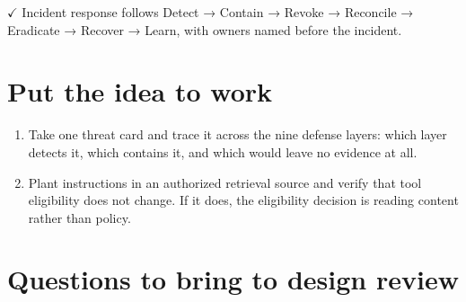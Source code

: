 \textbf{\ensuremath{\checkmark}} Incident response follows Detect → Contain → Revoke → Reconcile → Eradicate → Recover → Learn, with owners named before the incident.\par

\section{Put the idea to work}

\begin{enumerate}

\item Take one threat card and trace it across the nine defense layers: which layer detects it, which contains it, and which would leave no evidence at all.

\item Plant instructions in an authorized retrieval source and verify that tool eligibility does not change. If it does, the eligibility decision is reading content rather than policy.

\end{enumerate}

\section{Questions to bring to design review}

